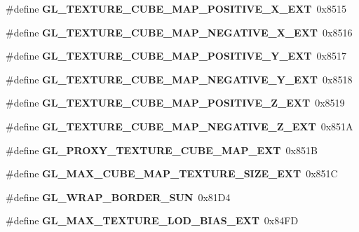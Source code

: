 \begin{DoxyCompactItemize}
\item 
\#define {\bfseries G\+L\+\_\+\+T\+E\+X\+T\+U\+R\+E\+\_\+\+C\+U\+B\+E\+\_\+\+M\+A\+P\+\_\+\+P\+O\+S\+I\+T\+I\+V\+E\+\_\+\+X\+\_\+\+E\+X\+T}~0x8515\label{_s_d_l__opengl_8h_a91b80e0a1b17c7c43a0b600a18453590}

\item 
\#define {\bfseries G\+L\+\_\+\+T\+E\+X\+T\+U\+R\+E\+\_\+\+C\+U\+B\+E\+\_\+\+M\+A\+P\+\_\+\+N\+E\+G\+A\+T\+I\+V\+E\+\_\+\+X\+\_\+\+E\+X\+T}~0x8516\label{_s_d_l__opengl_8h_a3d5db18efe926c7794bc80c90db463d8}

\item 
\#define {\bfseries G\+L\+\_\+\+T\+E\+X\+T\+U\+R\+E\+\_\+\+C\+U\+B\+E\+\_\+\+M\+A\+P\+\_\+\+P\+O\+S\+I\+T\+I\+V\+E\+\_\+\+Y\+\_\+\+E\+X\+T}~0x8517\label{_s_d_l__opengl_8h_a4c9debc2e4ed71ca6bef0ddecf1c9713}

\item 
\#define {\bfseries G\+L\+\_\+\+T\+E\+X\+T\+U\+R\+E\+\_\+\+C\+U\+B\+E\+\_\+\+M\+A\+P\+\_\+\+N\+E\+G\+A\+T\+I\+V\+E\+\_\+\+Y\+\_\+\+E\+X\+T}~0x8518\label{_s_d_l__opengl_8h_abd836ef8c6c0c15f2c0ba79c0c1c5d22}

\item 
\#define {\bfseries G\+L\+\_\+\+T\+E\+X\+T\+U\+R\+E\+\_\+\+C\+U\+B\+E\+\_\+\+M\+A\+P\+\_\+\+P\+O\+S\+I\+T\+I\+V\+E\+\_\+\+Z\+\_\+\+E\+X\+T}~0x8519\label{_s_d_l__opengl_8h_a32f85ceff1789ae7a3b4831f38a25bf4}

\item 
\#define {\bfseries G\+L\+\_\+\+T\+E\+X\+T\+U\+R\+E\+\_\+\+C\+U\+B\+E\+\_\+\+M\+A\+P\+\_\+\+N\+E\+G\+A\+T\+I\+V\+E\+\_\+\+Z\+\_\+\+E\+X\+T}~0x851\+A\label{_s_d_l__opengl_8h_a6e83377b6abfd6f4745f54be6325c689}

\item 
\#define {\bfseries G\+L\+\_\+\+P\+R\+O\+X\+Y\+\_\+\+T\+E\+X\+T\+U\+R\+E\+\_\+\+C\+U\+B\+E\+\_\+\+M\+A\+P\+\_\+\+E\+X\+T}~0x851\+B\label{_s_d_l__opengl_8h_a677dbdc42b7c2a3f6f668d25f6bdea7c}

\item 
\#define {\bfseries G\+L\+\_\+\+M\+A\+X\+\_\+\+C\+U\+B\+E\+\_\+\+M\+A\+P\+\_\+\+T\+E\+X\+T\+U\+R\+E\+\_\+\+S\+I\+Z\+E\+\_\+\+E\+X\+T}~0x851\+C\label{_s_d_l__opengl_8h_acdc8946afc66c01af845a27b822733a7}

\item 
\#define {\bfseries G\+L\+\_\+\+W\+R\+A\+P\+\_\+\+B\+O\+R\+D\+E\+R\+\_\+\+S\+U\+N}~0x81\+D4\label{_s_d_l__opengl_8h_ae096303460a67ed2755629b6d72d9f6d}

\item 
\#define {\bfseries G\+L\+\_\+\+M\+A\+X\+\_\+\+T\+E\+X\+T\+U\+R\+E\+\_\+\+L\+O\+D\+\_\+\+B\+I\+A\+S\+\_\+\+E\+X\+T}~0x84\+F\+D\label{_s_d_l__opengl_8h_a14d72e2a9325309a2f2ee86445c34432}


\end{DoxyCompactItemize}
